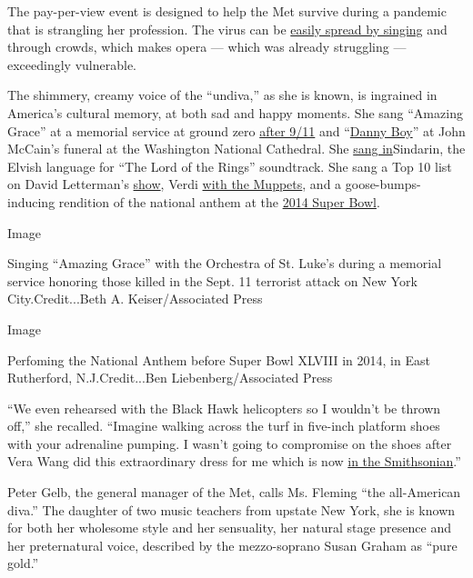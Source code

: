 The pay-per-view event is designed to help the Met survive during a
pandemic that is strangling her profession. The virus can be
\href{https://www.nytimes3xbfgragh.onion/2020/06/09/arts/music/choirs-singing-coronavirus-safe.html}{easily
spread by singing} and through crowds, which makes opera --- which was
already struggling --- exceedingly vulnerable.

The shimmery, creamy voice of the ``undiva,'' as she is known, is
ingrained in America's cultural memory, at both sad and happy moments.
She sang ``Amazing Grace'' at a memorial service at ground zero
\href{https://www.c-span.org/video/?c4619588/user-clip-world-trade-center-family-memorial-service}{after
9/11} and ``\href{https://www.youtube.com/watch?v=EPThqvkuky8}{Danny
Boy}'' at John McCain's funeral at the Washington National Cathedral.
She \href{https://www.youtube.com/watch?v=qzN7d94JXjI}{sang in}Sindarin,
the Elvish language for ``The Lord of the Rings'' soundtrack. She sang a
Top 10 list on David Letterman's
\href{https://www.youtube.com/watch?v=RZ59lj4Y_a0}{show}, Verdi
\href{https://www.youtube.com/watch?v=IPdP7XJdvlM\&feature=emb_title}{with
the Muppets}, and a goose-bumps-inducing rendition of the national
anthem at the \href{https://www.youtube.com/watch?v=N1h4zfO8Ais}{2014
Super Bowl}.

Image

Singing ``Amazing Grace'' with the Orchestra of St. Luke's during a
memorial service honoring those killed in the Sept. 11 terrorist attack
on New York City.Credit...Beth A. Keiser/Associated Press

Image

Perfoming the National Anthem before Super Bowl XLVIII in 2014, in East
Rutherford, N.J.Credit...Ben Liebenberg/Associated Press

``We even rehearsed with the Black Hawk helicopters so I wouldn't be
thrown off,'' she recalled. ``Imagine walking across the turf in
five-inch platform shoes with your adrenaline pumping. I wasn't going to
compromise on the shoes after Vera Wang did this extraordinary dress for
me which is now
\href{https://americanhistory.si.edu/blog/2014/06/ren\%C3\%A9e-flemings-super-bowl-gown-a-curatorial-jackpot.html}{in
the Smithsonian}.''

Peter Gelb, the general manager of the Met, calls Ms. Fleming ``the
all-American diva.'' The daughter of two music teachers from upstate New
York, she is known for both her wholesome style and her sensuality, her
natural stage presence and her preternatural voice, described by the
mezzo-soprano Susan Graham as ``pure gold.''

